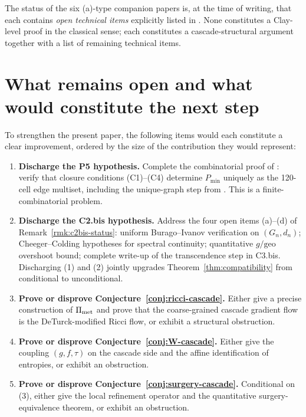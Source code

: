 \documentclass[11pt, a4paper]{amsart}
\theoremstyle{definition}
\begin{document}
\noindent
The status of the six (a)-type companion papers is, at the time of
writing, that each contains \emph{open technical items} explicitly
listed in \cite[Session addendum 2026-04-17]{CascadeWO}. None
constitutes a Clay-level proof in the classical sense; each
constitutes a cascade-structural argument together with a list of
remaining technical items.

\section{What remains open and what would constitute the next step}
\label{sec:open}

To strengthen the present paper, the following items would each
constitute a clear improvement, ordered by the size of the
contribution they would represent:

\begin{enumerate}
\item \textbf{Discharge the P5 hypothesis.} Complete the
  combinatorial proof of \cite[\S P5.1]{CascadePregeometry}: verify
  that closure conditions (C1)--(C4) determine $P_{\min}$ uniquely
  as the 120-cell edge multiset, including the unique-graph step
  from \cite[\S B.5]{VFDMasterMath}. This is a finite-combinatorial
  problem.
\item \textbf{Discharge the C2.bis hypothesis.} Address the four
  open items (a)--(d) of Remark~\ref{rmk:c2bis-status}: uniform
  Burago--Ivanov verification on $(G_{n}, d_{n})$;
  Cheeger--Colding hypotheses for spectral continuity; quantitative
  $g/\mathrm{geo}$ overshoot bound; complete write-up of the
  transcendence step in C3.bis. Discharging (1) and (2) jointly
  upgrades Theorem~\ref{thm:compatibility} from conditional to
  unconditional.
\item \textbf{Prove or disprove
  Conjecture~\ref{conj:ricci-cascade}.} Either give a precise
  construction of $\Pi_{\rm met}$ and prove that the coarse-grained
  cascade gradient flow is the DeTurck-modified Ricci flow, or
  exhibit a structural obstruction.
\item \textbf{Prove or disprove
  Conjecture~\ref{conj:W-cascade}.} Either give the coupling
  $(g, f, \tau)$ on the cascade side and the affine identification
  of entropies, or exhibit an obstruction.
\item \textbf{Prove or disprove
  Conjecture~\ref{conj:surgery-cascade}.} Conditional on (3), either
  give the local refinement operator and the quantitative
  surgery-equivalence theorem, or exhibit an obstruction.
\end{enumerate}
\end{document}
